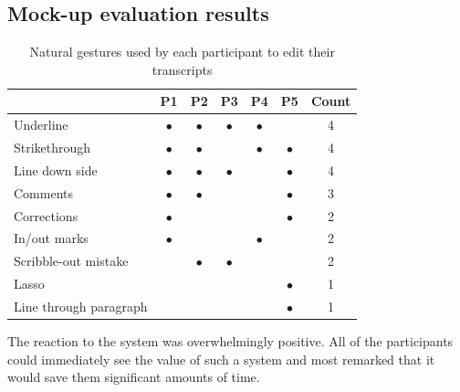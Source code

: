 
\subsection{Mock-up evaluation results}

\begin{table}[ht]
  \centering
  \begin{tabular}{l c c c c c c}
    \hline
    & \textbf{P1} & \textbf{P2} & \textbf{P3} & \textbf{P4} & \textbf{P5} & \textbf{Count} \\
    \hline
    Underline               & $\bullet$ & $\bullet$ & $\bullet$ & $\bullet$ &           & 4 \\
    Strikethrough           & $\bullet$ & $\bullet$ &           & $\bullet$ & $\bullet$ & 4 \\
    Line down side          & $\bullet$ & $\bullet$ & $\bullet$ &           & $\bullet$ & 4 \\
    Comments                & $\bullet$ & $\bullet$ &           &           & $\bullet$ & 3 \\
    Corrections             & $\bullet$ &           &           &           & $\bullet$ & 2 \\
    In/out marks            & $\bullet$ &           &           & $\bullet$ &           & 2 \\
    Scribble-out mistake    &           & $\bullet$ & $\bullet$ &           &           & 2 \\
    Lasso                   &           &           &           &           & $\bullet$ & 1 \\
    Line through paragraph  &           &           &           &           & $\bullet$ & 1 \\
    \hline
  \end{tabular}
  \caption{Natural gestures used by each participant to edit their transcripts}
  \label{tab:natural-gestures}
\end{table}

The reaction to the system was overwhelmingly positive. All of the participants could immediately see the value of such
a system and most remarked that it would save them significant amounts of time.

